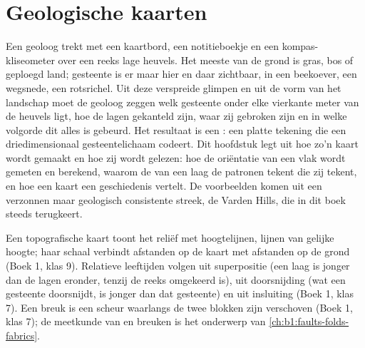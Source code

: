 \chapter{Geologische kaarten}\label{ch:b1:geological-maps}

Een geoloog trekt met een kaartbord, een notitieboekje en een kompas-kliseometer over een
reeks lage heuvels. Het meeste van de grond is gras, bos of geploegd land; gesteente is er
maar hier en daar zichtbaar, in een beekoever, een wegsnede, een rotsrichel. Uit deze
verspreide glimpen en uit de vorm van het landschap moet de geoloog zeggen welk gesteente
onder elke vierkante meter van de heuvels ligt, hoe de lagen gekanteld zijn, waar zij
gebroken zijn en in welke volgorde dit alles is gebeurd. Het resultaat is een : een platte tekening die een driedimensionaal gesteentelichaam codeert.
Dit hoofdstuk legt uit hoe zo'n kaart wordt gemaakt en hoe zij wordt gelezen: hoe de
oriëntatie van een vlak wordt gemeten en berekend, waarom de  van een laag de
patronen tekent die zij tekent, en hoe een kaart een geschiedenis vertelt. De voorbeelden
komen uit een verzonnen maar geologisch consistente streek, de Varden Hills, die in dit boek
steeds terugkeert.

\begin{recall}
Een topografische kaart toont het reliëf met hoogtelijnen, lijnen van gelijke hoogte; haar
schaal verbindt afstanden op de kaart met afstanden op de grond (Boek 1, klas 9). Relatieve
leeftijden volgen uit superpositie (een laag is jonger dan de lagen eronder, tenzij de reeks
omgekeerd is), uit doorsnijding (wat een gesteente doorsnijdt, is jonger dan dat gesteente)
en uit insluiting (Boek 1, klas 7). Een breuk is een scheur waarlangs de twee blokken zijn
verschoven (Boek 1, klas 7); de meetkunde van  en breuken is het onderwerp van
\cref{ch:b1:faults-folds-fabrics}.
\end{recall}

